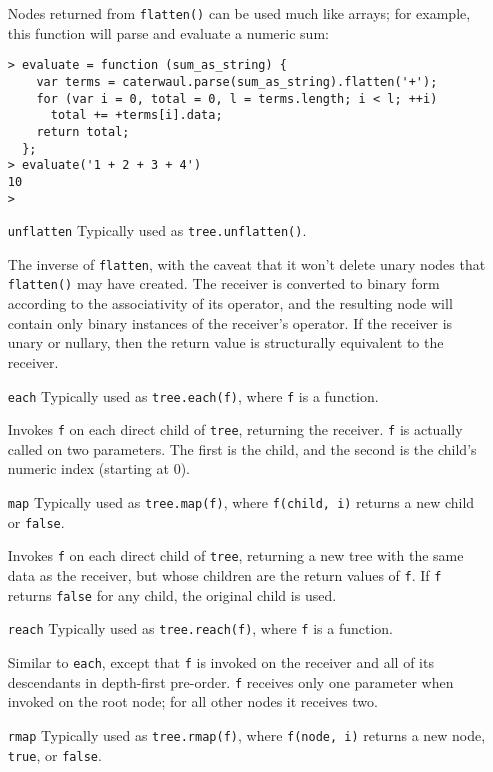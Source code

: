 \documentclass{report}
\begin{document}
\begin{enumerate}
  Nodes returned from {\tt flatten()} can be used much like arrays; for example, this function will parse and evaluate a numeric sum:

\begin{verbatim}
> evaluate = function (sum_as_string) {
    var terms = caterwaul.parse(sum_as_string).flatten('+');
    for (var i = 0, total = 0, l = terms.length; i < l; ++i)
      total += +terms[i].data;
    return total;
  };
> evaluate('1 + 2 + 3 + 4')
10
>
\end{verbatim}

\item[{\tt unflatten}]
  Typically used as {\tt tree.unflatten()}.

  The inverse of {\tt flatten}, with the caveat that it won't delete unary nodes that {\tt flatten()} may have created. The receiver is converted to binary form according to the
  associativity of its operator, and the resulting node will contain only binary instances of the receiver's operator. If the receiver is unary or nullary, then the return value is
  structurally equivalent to the receiver.

\item[{\tt each}]
  Typically used as {\tt tree.each(f)}, where {\tt f} is a function.

  Invokes {\tt f} on each direct child of {\tt tree}, returning the receiver. {\tt f} is actually called on two parameters. The first is the child, and the second is the child's numeric
  index (starting at 0).

\item[{\tt map}]
  Typically used as {\tt tree.map(f)}, where {\tt f(child, i)} returns a new child or {\tt false}.

  Invokes {\tt f} on each direct child of {\tt tree}, returning a new tree with the same data as the receiver, but whose children are the return values of {\tt f}. If {\tt f} returns
  {\tt false} for any child, the original child is used.

\item[{\tt reach}]
  Typically used as {\tt tree.reach(f)}, where {\tt f} is a function.

  Similar to {\tt each}, except that {\tt f} is invoked on the receiver and all of its descendants in depth-first pre-order. {\tt f} receives only one parameter when invoked on the root
  node; for all other nodes it receives two.

\item[{\tt rmap}]
  Typically used as {\tt tree.rmap(f)}, where {\tt f(node, i)} returns a new node, {\tt true}, or {\tt false}.


\end{enumerate}
\end{document}
